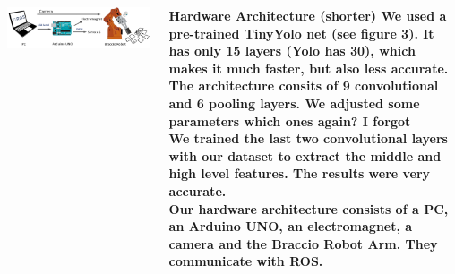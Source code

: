 \documentclass[25pt, a0paper, landscape]{tikzposter}
\begin{document}
\begin{columns}
{ 				\begin{minipage}{\columnwidth}
 					\begin{minipage}{800 pt}
			  	    	\begin{tikzfigure}
			  	    		\includegraphics[width = 800 pt]{hardware_structure2}
			  	    	\end{tikzfigure}
 					\end{minipage}
 					\hspace{50 pt}
 					\begin{minipage}{500 pt}
 						\bfseries{Hardware Architecture (shorter)}
 						\normalfont
						We used a pre-trained TinyYolo net (see figure 3). It has only 15 layers (Yolo has 30), which makes it much faster, but also less accurate. The architecture consits of 9 convolutional and 6 pooling layers. We adjusted some parameters \bfseries{which ones again? I forgot}\\
						\normalfont We trained the last two convolutional layers with our dataset to extract the middle and high level features. The results were very accurate.\\
						Our hardware architecture consists of a PC, an Arduino UNO, an electromagnet, a camera and the Braccio Robot Arm. They communicate with ROS.
 					\end{minipage}
 				\end{minipage}
    }
\end{columns}
\end{document}
